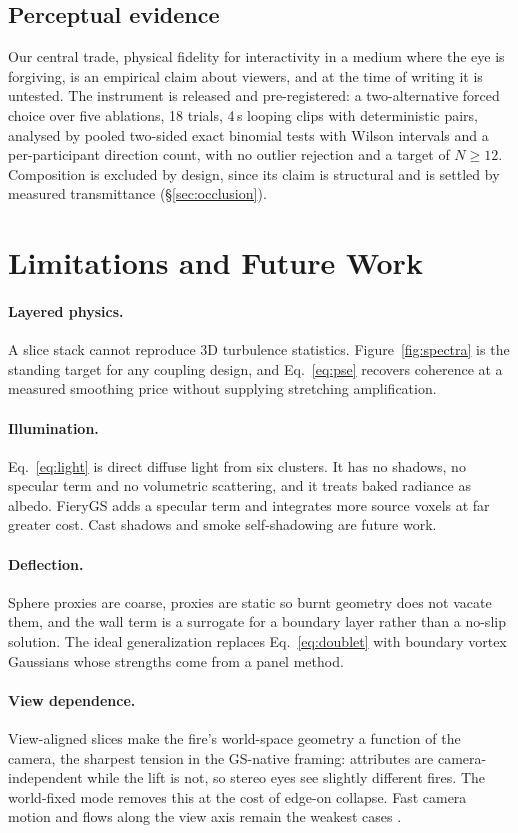 \documentclass[acmtog,nonacm]{acmart}
\begin{document}
\subsection{Perceptual evidence}
Our central trade, physical fidelity for interactivity in a medium where the eye is forgiving, is an empirical claim about viewers, and at the time of writing it is untested. The instrument is released and pre-registered: a two-alternative forced choice over five ablations, 18 trials, 4\,s looping clips with deterministic pairs, analysed by pooled two-sided exact binomial tests with Wilson intervals and a per-participant direction count, with no outlier rejection and a target of $N\geq12$. Composition is excluded by design, since its claim is structural and is settled by measured transmittance (\S\ref{sec:occlusion}).

\section{Limitations and Future Work}
\paragraph{Layered physics.} A slice stack cannot reproduce 3D turbulence statistics. Figure~\ref{fig:spectra} is the standing target for any coupling design, and Eq.~\ref{eq:pse} recovers coherence at a measured smoothing price without supplying stretching amplification.

\paragraph{Illumination.} Eq.~\ref{eq:light} is direct diffuse light from six clusters. It has no shadows, no specular term and no volumetric scattering, and it treats baked radiance as albedo. FieryGS adds a specular term and integrates more source voxels at far greater cost. Cast shadows and smoke self-shadowing are future work.

\paragraph{Deflection.} Sphere proxies are coarse, proxies are static so burnt geometry does not vacate them, and the wall term is a surrogate for a boundary layer rather than a no-slip solution. The ideal generalization replaces Eq.~\ref{eq:doublet} with boundary vortex Gaussians whose strengths come from a panel method.

\paragraph{View dependence.} View-aligned slices make the fire's world-space geometry a function of the camera, the sharpest tension in the GS-native framing: attributes are camera-independent while the lift is not, so stereo eyes see slightly different fires. The world-fixed mode removes this at the cost of edge-on collapse. Fast camera motion and flows along the view axis remain the weakest cases \cite{horvath2009}.
\end{document}

